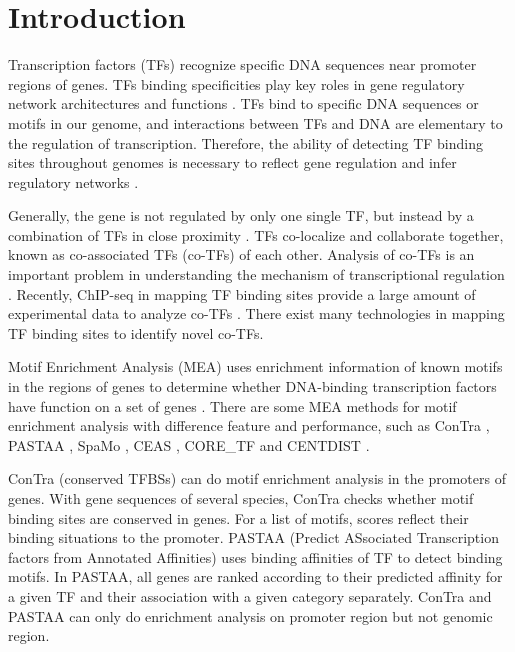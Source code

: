 \documentclass[journal,transmag]{IEEEtran}
\begin{document}
\maketitle \IEEEdisplaynontitleabstractindextext
\IEEEpeerreviewmaketitle



\section{Introduction}

Transcription factors (TFs) recognize specific DNA sequences near
promoter regions of genes. TFs binding specificities play key roles
in gene regulatory network architectures and functions \cite{mybibfile:tfs}. TFs bind to
specific DNA sequences or motifs in our genome, and interactions
between TFs and DNA are elementary to the regulation of
transcription. Therefore, the ability of detecting TF binding sites
throughout genomes is necessary to reflect gene regulation and infer
regulatory networks \cite{mybibfile:proteindna} \cite{mybibfile:chipseqtfs}.


Generally, the gene is not regulated by only one single TF, but
instead by a combination of TFs in close proximity \cite{mybibfile:multiregulator}. TFs co-localize
and collaborate together, known as co-associated TFs (co-TFs) of
each other. Analysis of co-TFs is an important problem in
understanding the mechanism of transcriptional regulation \cite{mybibfile:transregulation} \cite{mybibfile:tfscoregu} \cite{mybibfile:tfcoexpress}. Recently,
ChIP-seq in mapping TF binding sites provide a large amount of
experimental data to analyze co-TFs \cite{mybibfile:chipseqqa} \cite{mybibfile:chipchipseq} \cite{mybibfile:chipvivo}. There exist many technologies
in mapping TF binding sites to identify novel co-TFs.


Motif Enrichment Analysis (MEA) uses enrichment information of known
motifs in the regions of genes to determine whether DNA-binding
transcription factors have function on a set of genes
\cite{mybibfile:mea}. There are some MEA methods for motif
enrichment analysis with difference feature and performance, such as
ConTra \cite{mybibfile:contra}, PASTAA \cite{mybibfile:pastaa},
SpaMo \cite{mybibfile:spamo}, CEAS \cite{mybibfile:ceas}, CORE\_TF
\cite{mybibfile:coretf} and CENTDIST \cite{mybibfile:centdist}.


ConTra (conserved TFBSs) can do motif enrichment analysis in the
promoters of genes. With gene sequences of several species, ConTra
checks whether motif binding sites are conserved in genes. For a
list of motifs, scores reflect their binding situations to the
promoter. PASTAA (Predict ASsociated Transcription factors from
Annotated Affinities) uses binding affinities of TF to detect
binding motifs. In PASTAA, all genes are ranked according to their
predicted affinity for a given TF and their association with a given
category separately. ConTra and PASTAA can only do enrichment
analysis on promoter region but not genomic region.
\end{document}
